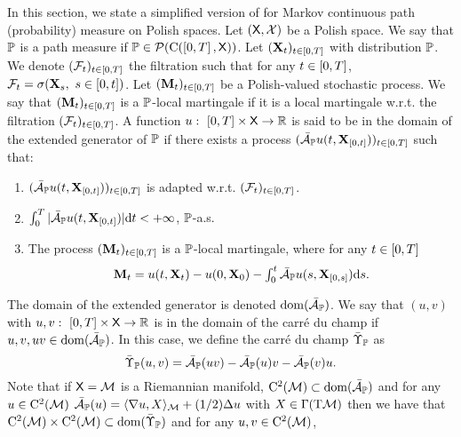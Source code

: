 In this section, we state a simplified version of \citet[Theorem
3.17]{cattiaux2021time} for Markov continuous path (probability) measure on
Polish spaces. Let $(\mathsf{X}, \mathcal{X})$ be a Polish space. We say that $\mathbb{P}$ is a
path measure if $\mathbb{P} \in \mathcal{P}(\mathrm{C}(\left[0,T\right], \mathsf{X}))$. Let
$(\mathbf{X}_t)_{t \in \left[0,T\right]}$ with distribution $\mathbb{P}$. We denote
$(\mathcal{F}_t)_{t \in \left[0,T\right]}$ the filtration such that for any
$t \in \left[0,T\right]$, $\mathcal{F}_t = \sigma(\mathbf{X}_s, \ s \in \left[0,t\right])$. Let
$(\mathbf{M}_t)_{t \in \left[0,T\right]}$ be a Polish-valued stochastic process. We say that
$(\mathbf{M}_t)_{t \in \left[0,T\right]}$ is a $\mathbb{P}$-local martingale if it is a local
martingale w.r.t. the filtration $(\mathcal{F}_t)_{t \in \left[0,T\right]}$. A function
$u: \ \left[0,T\right] \times \mathsf{X} \to \mathbb{R}$ is said to be in the domain of the
extended generator of $\mathbb{P}$ if there exists a process
$(\bar{\mathcal{A}}_{\mathbb{P}} u(t, \mathbf{X}_{\left[0,t\right]}))_{t \in \left[0,T\right]}$ such that:
\begin{enumerate}[label= (\alph*),  wide, labelwidth=!, labelindent=0pt]
\item $(\bar{\mathcal{A}}_{\mathbb{P}} u(t, \mathbf{X}_{\left[0,t\right]}))_{t \in \left[0,T\right]}$ is adapted w.r.t. $(\mathcal{F}_t)_{t \in \left[0,T\right]}$.
\item $\int_0^T \vert \bar{\mathcal{A}}_{\mathbb{P}} u(t, \mathbf{X}_{\left[0,t\right]}) \vert \mathrm{d} t < +\infty$, $\mathbb{P}$-a.s.
\item The process $(\mathbf{M}_t)_{t \in \left[0,T\right]}$ is a $\mathbb{P}$-local martingale,
  where for any $t \in \left[0,T\right]$
  \begin{equation}
    \textstyle{\mathbf{M}_t = u(t,\mathbf{X}_t) - u(0, \mathbf{X}_0) - \int_0^t \bar{\mathcal{A}}_{\mathbb{P}}u(s, \mathbf{X}_{\left[0,s\right]}) \mathrm{d}s   .}
  \end{equation}
\end{enumerate}
The domain of the extended generator is denoted $\mathrm{dom}(\bar{\mathcal{A}}_{\mathbb{P}})$. We say
that $(u,v)$ with $u,v : \ \left[0,T\right] \times \mathsf{X} \to \mathbb{R}$ is in the domain
of the carr\'e du champ if $u,v, uv \in \mathrm{dom}(\bar{\mathcal{A}}_{\mathbb{P}})$. In this case, we
define the carr\'e du champ $\bar{\Upsilon}_{\mathbb{P}}$ as
\begin{equation}
  \bar{\Upsilon}_{\mathbb{P}}(u,v) = \bar{\mathcal{A}}_{\mathbb{P}}(uv) - \bar{\mathcal{A}}_{\mathbb{P}}(u)v - \bar{\mathcal{A}}_{\mathbb{P}}(v)u  . 
\end{equation}
Note that if $\mathsf{X} = \mathcal M$ is a Riemannian manifold,
$\mathrm{C}^2(\mathcal M) \subset \mathrm{dom}(\bar{\mathcal{A}}_{\mathbb{P}})$ and for any $u \in \mathrm{C}^2(\mathcal M)$
$\bar{\mathcal{A}}_{\mathbb{P}}(u) = \langle \nabla u, X \rangle_\mathcal M + (1/2)\Delta u$ with
$X \in \Gamma(\mathrm{T}\mathcal{M})$  then we have that $\mathrm{C}^2(\mathcal M) \times \mathrm{C}^2(\mathcal M) \subset \mathrm{dom}(\bar{\Upsilon}_{\mathbb{P}})$
and for any $u, v \in \mathrm{C}^2(\mathcal M)$,
